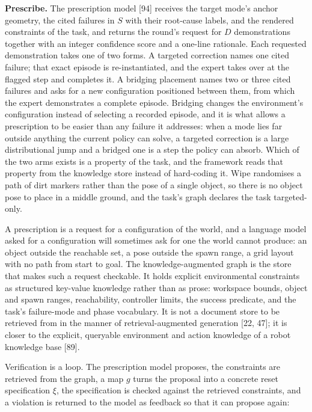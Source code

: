 \documentclass[
  11pt,
]{article}
\begin{document}
\textbf{Prescribe.} The prescription model {[}94{]} receives the target
mode's anchor geometry, the cited failures in \(S\) with their
root-cause labels, and the rendered constraints of the task, and returns
the round's request for \(D\) demonstrations together with an integer
confidence score and a one-line rationale. Each requested demonstration
takes one of two forms. A targeted correction names one cited failure;
that exact episode is re-instantiated, and the expert takes over at the
flagged step and completes it. A bridging placement names two or three
cited failures and asks for a new configuration positioned between them,
from which the expert demonstrates a complete episode. Bridging changes
the environment's configuration instead of selecting a recorded episode,
and it is what allows a prescription to be easier than any failure it
addresses: when a mode lies far outside anything the current policy can
solve, a targeted correction is a large distributional jump and a
bridged one is a step the policy can absorb. Which of the two arms
exists is a property of the task, and the framework reads that property
from the knowledge store instead of hard-coding it. Wipe randomises a
path of dirt markers rather than the pose of a single object, so there
is no object pose to place in a middle ground, and the task's graph
declares the task targeted-only.

A prescription is a request for a configuration of the world, and a
language model asked for a configuration will sometimes ask for one the
world cannot produce: an object outside the reachable set, a pose
outside the spawn range, a grid layout with no path from start to goal.
The knowledge-augmented graph is the store that makes such a request
checkable. It holds explicit environmental constraints as structured
key-value knowledge rather than as prose: workspace bounds, object and
spawn ranges, reachability, controller limits, the success predicate,
and the task's failure-mode and phase vocabulary. It is not a document
store to be retrieved from in the manner of retrieval-augmented
generation {[}22, 47{]}; it is closer to the explicit, queryable
environment and action knowledge of a robot knowledge base {[}89{]}.

Verification is a loop. The prescription model proposes, the constraints
are retrieved from the graph, a map \(g\) turns the proposal into a
concrete reset specification \(\xi\), the specification is checked
against the retrieved constraints, and a violation is returned to the
model as feedback so that it can propose again:
\end{document}

